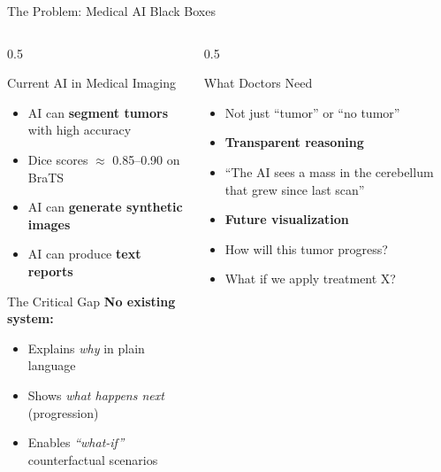 \documentclass[aspectratio=169,xcolor=dvipsnames]{beamer}
\begin{document}
\begin{frame}{The Problem: Medical AI Black Boxes}
    \begin{columns}
        \begin{column}{0.5\textwidth}
            \begin{block}{Current AI in Medical Imaging}
                \begin{itemize}
                    \item AI can \textbf{segment tumors} with high accuracy
                    \item Dice scores $\approx$ 0.85--0.90 on BraTS
                    \item AI can \textbf{generate synthetic images}
                    \item AI can produce \textbf{text reports}
                \end{itemize}
            \end{block}
            
            \vspace{0.5em}
            
            \begin{alertblock}{The Critical Gap}
                \textbf{No existing system:}
                \begin{itemize}
                    \item Explains \textit{why} in plain language
                    \item Shows \textit{what happens next} (progression)
                    \item Enables \textit{``what-if''} counterfactual scenarios
                \end{itemize}
            \end{alertblock}
        \end{column}
        
        \begin{column}{0.5\textwidth}
            \begin{block}{What Doctors Need}
                \begin{itemize}
                    \item Not just ``tumor'' or ``no tumor''
                    \item \textbf{Transparent reasoning}
                    \item ``The AI sees a mass in the cerebellum that grew since last scan''
                    \item \textbf{Future visualization}
                    \item How will this tumor progress?
                    \item What if we apply treatment X?
                \end{itemize}
            \end{block}
            

\end{column}
\end{columns}
\end{frame}
\end{document}
